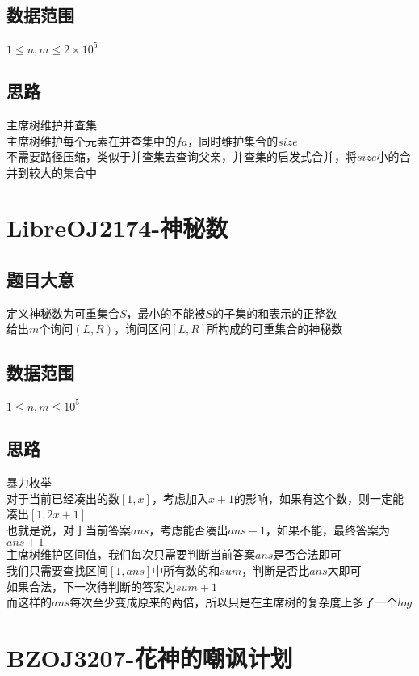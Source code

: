 \documentclass{ctexart}
\numberwithin{equation}{section}
\begin{document}
\begin{flushleft}
  \subsection{数据范围}
  $1\le n,m \le 2\times 10^5$
  \subsection{思路}
  主席树维护并查集\\
  主席树维护每个元素在并查集中的$fa$，同时维护集合的$size$\\
  不需要路径压缩，类似于并查集去查询父亲，并查集的启发式合并，将$size$小的合并到较大的集合中
  \newpage

  \section{LibreOJ2174-神秘数}
  \subsection{题目大意}
  定义神秘数为可重集合$S$，最小的不能被$S$的子集的和表示的正整数\\
  给出$m$个询问$(L, R)$，询问区间$[L,R]$所构成的可重集合的神秘数\\
  \subsection{数据范围}
  $1\le n,m \le 10^5$
  \subsection{思路}
  暴力枚举\\
  对于当前已经凑出的数$[1,x]$，考虑加入$x+1$的影响，如果有这个数，则一定能凑出$[1,2x+1]$\\
  也就是说，对于当前答案$ans$，考虑能否凑出$ans+1$，如果不能，最终答案为$ans+1$\\
  主席树维护区间值，我们每次只需要判断当前答案$ans$是否合法即可\\
  我们只需要查找区间$[1,ans]$中所有数的和$sum$，判断是否比$ans$大即可\\
  如果合法，下一次待判断的答案为$sum+1$\\
  而这样的$ans$每次至少变成原来的两倍，所以只是在主席树的复杂度上多了一个$log$\\
  \newpage

  \section{BZOJ3207-花神的嘲讽计划}

\end{flushleft}
\end{document}
